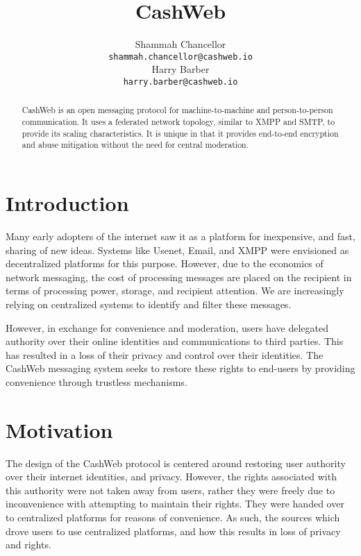 \documentclass{article}
\title{CashWeb}
\author{
  Shammah Chancellor \\
  \texttt{shammah.chancellor@cashweb.io} \\
  \And
  Harry Barber \\
  \texttt{harry.barber@cashweb.io} \\
}
\theoremstyle{definition}
\begin{document}
\maketitle

\begin{abstract}
CashWeb is an open messaging protocol for machine-to-machine and person-to-person communication. It uses a federated network topology, similar to XMPP and SMTP, to provide its scaling characteristics. It is unique in that it provides end-to-end encryption and abuse mitigation without the need for central moderation.
\end{abstract}

\section{Introduction}
Many early adopters of the internet saw it as a platform for inexpensive, and fast, sharing of new ideas. Systems like Usenet\cite{rfc5536}\cite{rfc5537}, Email, and XMPP\cite{rfc3920}\cite{rfc3921}\cite{rfc3922}\cite{rfc3923} were envisioned as decentralized platforms for this purpose. However, due to the economics of network messaging, the cost of processing messages are placed on the recipient in terms of processing power, storage, and recipient attention. We are increasingly relying on centralized systems to identify and filter these messages.

However, in exchange for convenience and moderation, users have delegated authority over their online identities and communications to third parties. This has resulted in a loss of their privacy and control over their identities. The CashWeb messaging system seeks to restore these rights to end-users by providing convenience through trustless mechanisms. 

\section{Motivation}

The design of the CashWeb protocol is centered around restoring user authority over their internet identities, and privacy. However, the rights associated with this authority were not taken away from users, rather they were freely due to inconvenience with attempting to maintain their rights. They were handed over to centralized platforms for reasons of convenience. As such, the sources which drove users to use centralized platforms, and how this results in loss of privacy and rights.
\end{document}
